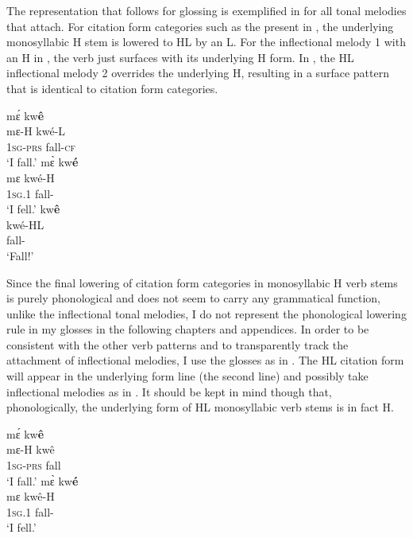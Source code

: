 The representation that follows for glossing is exemplified in  for all tonal melodies that attach. For citation form categories such as the present in , the underlying monosyllabic H stem is lowered to HL by an L. For the inflectional melody 1 with an H in , the verb just surfaces with its underlying H form. In , the HL inflectional melody 2 overrides the underlying H, resulting in a surface pattern that is identical to citation form categories.

\ea\label{Detachkwe}
  \ea \label{Detachkwe1}
  \glll     mɛ́ kw{\bfseries ê} \\
	mɛ-H kwé-L \\	
            1\textsc{sg}-\textsc{prs} fall-\textsc{cf}     \\
    \trans `I fall.'
\ex\label{Detachkwe2}
  \glll    mɛ̀ kw{\bfseries é} \\
	mɛ kwé-H \\	
            1\textsc{sg}.{\PST}1 fall-{\PST}     \\
    \trans `I fell.'
\ex\label{Detachkwe3}
  \glll   kw{\bfseries ê} \\
	kwé-HL \\	
            fall-{\IMP}     \\
    \trans `Fall!'
\z
\z

Since the final lowering of citation form categories in monosyllabic H verb stems is purely phonological  and does not seem to carry any grammatical function, unlike the inflectional tonal melodies, I do not represent the phonological lowering rule in my glosses in the following chapters and appendices.  In order to be consistent with the other verb patterns and to transparently track the attachment of inflectional melodies, I use the glosses as in . The HL citation form will appear in the underlying form line (the second line) and possibly take inflectional melodies as in . It should be kept in mind though that, phonologically, the underlying form of HL monosyllabic verb stems is in fact H.


\ea\label{Detachkweb}
  \ea \label{Detachkwe1b}
  \glll     mɛ́ kw{\bfseries ê} \\
	mɛ-H kwê \\	
            1\textsc{sg}-\textsc{prs} fall     \\
    \trans `I fall.'
\ex\label{Detachkwe2b}
  \glll    mɛ̀ kw{\bfseries é} \\
	mɛ kwê-H \\	
            1\textsc{sg}.{\PST}1 fall-{\PST}     \\
    \trans `I fell.'
\z
\z

